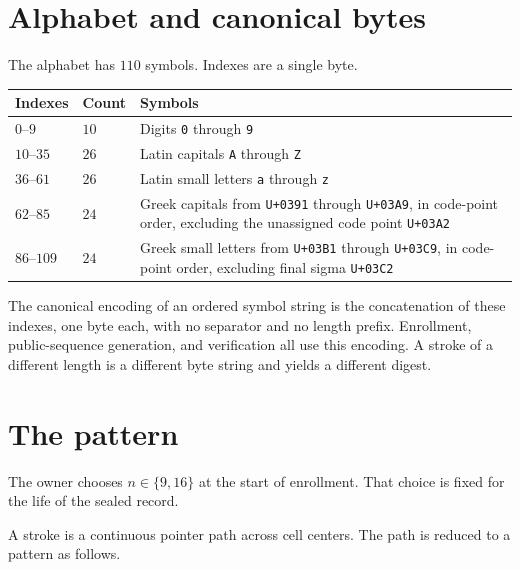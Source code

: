 \documentclass[11pt]{article}
\begin{document}
\section{Alphabet and canonical bytes}
\label{sec:alphabet}

The alphabet has \(110\) symbols.
Indexes are a single byte.

\begin{center}
\begin{tabular}{@{}llp{3.3in}@{}}
  \toprule
  Indexes & Count & Symbols \\
  \midrule
  \(0\)--\(9\) & \(10\) & Digits \texttt{0} through \texttt{9} \\
  \(10\)--\(35\) & \(26\) & Latin capitals \texttt{A} through \texttt{Z} \\
  \(36\)--\(61\) & \(26\) & Latin small letters \texttt{a} through \texttt{z} \\
  \(62\)--\(85\) & \(24\) &
    Greek capitals from \texttt{U+0391} through \texttt{U+03A9}, in code-point order, excluding the unassigned code point \texttt{U+03A2} \\
  \(86\)--\(109\) & \(24\) &
    Greek small letters from \texttt{U+03B1} through \texttt{U+03C9}, in code-point order, excluding final sigma \texttt{U+03C2} \\
  \bottomrule
\end{tabular}
\end{center}

The canonical encoding of an ordered symbol string is the concatenation of these indexes, one byte each, with no separator and no length prefix.
Enrollment, public-sequence generation, and verification all use this encoding.
A stroke of a different length is a different byte string and yields a different digest.

\section{The pattern}
\label{sec:pattern}

The owner chooses \(n \in \{9,16\}\) at the start of enrollment.
That choice is fixed for the life of the sealed record.

A stroke is a continuous pointer path across cell centers.
The path is reduced to a pattern as follows.
\end{document}
